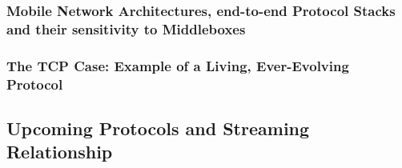 \subsubsection{Mobile Network Architectures, end-to-end Protocol Stacks and their sensitivity to Middleboxes}

\subsubsection{The TCP Case: Example of a Living, Ever-Evolving Protocol}



\subsection{Upcoming Protocols and Streaming Relationship}


